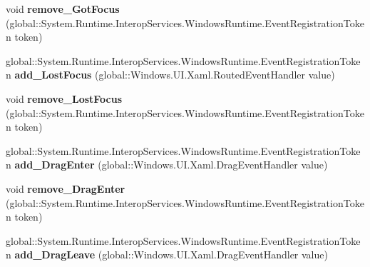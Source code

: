 \begin{DoxyCompactItemize}
\item 
\mbox{\label{interface_windows_1_1_u_i_1_1_xaml_1_1_i_u_i_element_ac7da9e77287c0c2d8bdfd22d90914fb3}} 
void {\bfseries remove\+\_\+\+Got\+Focus} (global\+::\+System.\+Runtime.\+Interop\+Services.\+Windows\+Runtime.\+Event\+Registration\+Token token)
\item 
\mbox{\label{interface_windows_1_1_u_i_1_1_xaml_1_1_i_u_i_element_a8eff735911e4175474bbec6b8aa79b15}} 
global\+::\+System.\+Runtime.\+Interop\+Services.\+Windows\+Runtime.\+Event\+Registration\+Token {\bfseries add\+\_\+\+Lost\+Focus} (global\+::\+Windows.\+U\+I.\+Xaml.\+Routed\+Event\+Handler value)
\item 
\mbox{\label{interface_windows_1_1_u_i_1_1_xaml_1_1_i_u_i_element_a735a5482f18ebef41ee23b3508022834}} 
void {\bfseries remove\+\_\+\+Lost\+Focus} (global\+::\+System.\+Runtime.\+Interop\+Services.\+Windows\+Runtime.\+Event\+Registration\+Token token)
\item 
\mbox{\label{interface_windows_1_1_u_i_1_1_xaml_1_1_i_u_i_element_a2fed84aaafd99d2ab6c95997a486fc7a}} 
global\+::\+System.\+Runtime.\+Interop\+Services.\+Windows\+Runtime.\+Event\+Registration\+Token {\bfseries add\+\_\+\+Drag\+Enter} (global\+::\+Windows.\+U\+I.\+Xaml.\+Drag\+Event\+Handler value)
\item 
\mbox{\label{interface_windows_1_1_u_i_1_1_xaml_1_1_i_u_i_element_a5a5960af1b1feea08a32346a9df72973}} 
void {\bfseries remove\+\_\+\+Drag\+Enter} (global\+::\+System.\+Runtime.\+Interop\+Services.\+Windows\+Runtime.\+Event\+Registration\+Token token)
\item 
\mbox{\label{interface_windows_1_1_u_i_1_1_xaml_1_1_i_u_i_element_ad7eb2baf580fcb2515afa4af987599d4}} 
global\+::\+System.\+Runtime.\+Interop\+Services.\+Windows\+Runtime.\+Event\+Registration\+Token {\bfseries add\+\_\+\+Drag\+Leave} (global\+::\+Windows.\+U\+I.\+Xaml.\+Drag\+Event\+Handler value)
\item 
\mbox{\label{interface_windows_1_1_u_i_1_1_xaml_1_1_i_u_i_element_ad457a93ec08cee7b4f4b038673af7df0}} 

\end{DoxyCompactItemize}
